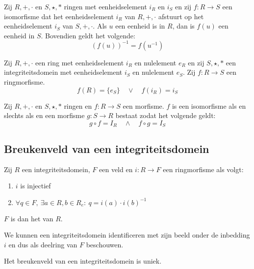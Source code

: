 \documentclass[main.tex]{subfiles}
\begin{document}
\begin{ei}
  Zij $R,+,\cdot$ en $S,\star,*$ ringen met eenheidselement $i_{R}$ en $i_{S}$ en zij $f: R\rightarrow S$ een isomorfisme dat het eenheidselement $i_{R}$ van $R,+,\cdot$ afstuurt op het eenheidselement $i_{S}$ van $S,+,\cdot$.
  Als $u$ een eenheid is in $R$, dan is $f(u)$ een eenheid in $S$.
  Bovendien geldt het volgende:
  \[ (f(u))^{-1} = f(u^{-1}) \]
\end{ei}

\begin{pr}
  Zij $R,+,\cdot$ een ring met eenheidselement $i_{R}$ en nulelement $e_{R}$ en zij $S,\star,*$ een integriteitsdomein met eenheidselement $i_{S}$ en nulelement $e_{S}$.
  Zij $f: R \rightarrow S$ een ringmorfisme.
  \[ f(R) = \{e_{S}\} \quad\vee\quad f(i_{R}) = i_{S} \]
\end{pr}

\begin{pr}
  Zij $R,+,\cdot$ en $S,\star,*$ ringen en $f: R \rightarrow S$ een morfisme.
  $f$ is een isomorfisme als en slechts als en een morfisme $g: S \rightarrow R$ bestaat zodat het volgende geldt:
  \[ g \circ f = I_{R} \quad\wedge\quad f \circ g = I_{S} \]
\end{pr}

\subsection{Breukenveld van een integriteitsdomein}
\label{sec:breukenveld-van-een-integriteitsdomein}

\begin{de}
  Zij $R$ een integriteitsdomein, $F$ een veld en $i: R \rightarrow F$ een ringmorfisme als volgt:
  \begin{enumerate}
  \item $i$ is injectief
  \item $\forall q \in F,\ \exists a \in R, b\in R_{e}:\ q = i(a)\cdot i(b)^{-1}$
  \end{enumerate}
  $F$ is dan het  van $R$.
\end{de}

\begin{st}
  We kunnen een integriteitsdomein identificeren met zijn beeld onder de inbedding $i$ en dus als deelring van $F$ beschouwen.
\end{st}

\begin{ei}
  Het breukenveld van een integriteitsdomein is uniek.
\end{ei}
\end{document}
